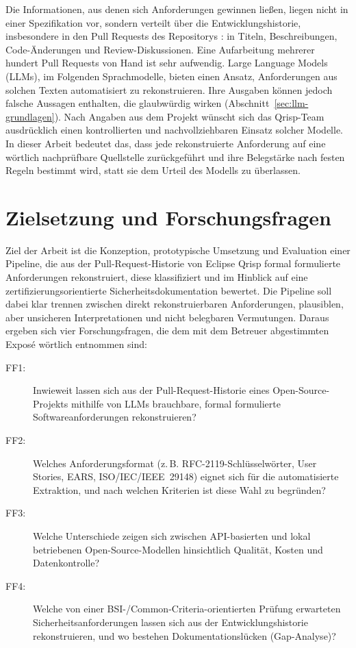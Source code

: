 \documentclass[11pt,a4paper]{report}
\begin{document}
Die Informationen, aus denen sich Anforderungen gewinnen ließen, liegen
nicht in einer Spezifikation vor, sondern verteilt über die
Entwicklungshistorie, insbesondere in den Pull Requests des Repositorys
: in Titeln, Beschreibungen, Code-Änderungen
und Review-Diskussionen. Eine Aufarbeitung mehrerer hundert Pull
Requests von Hand ist sehr aufwendig. Large Language Models (LLMs), im
Folgenden Sprachmodelle, bieten einen Ansatz, Anforderungen aus solchen
Texten automatisiert zu rekonstruieren. Ihre Ausgaben können jedoch
falsche Aussagen enthalten, die glaubwürdig wirken
(Abschnitt~\ref{sec:llm-grundlagen}). Nach Angaben aus dem Projekt
wünscht sich das Qrisp-Team ausdrücklich einen kontrollierten und
nachvollziehbaren Einsatz solcher Modelle. In dieser Arbeit bedeutet
das, dass jede rekonstruierte Anforderung auf eine wörtlich
nachprüfbare Quellstelle zurückgeführt und ihre Belegstärke nach festen
Regeln bestimmt wird, statt sie dem Urteil des Modells zu überlassen.

\section{Zielsetzung und Forschungsfragen}
\label{sec:einl-ziel}

Ziel der Arbeit ist die Konzeption, prototypische Umsetzung und
Evaluation einer Pipeline, die aus der Pull-Request-Historie von Eclipse
Qrisp formal formulierte Anforderungen rekonstruiert, diese klassifiziert
und im Hinblick auf eine zertifizierungsorientierte
Sicherheitsdokumentation bewertet. Die Pipeline soll dabei klar
trennen zwischen direkt rekonstruierbaren Anforderungen, plausiblen, aber
unsicheren Interpretationen und nicht belegbaren Vermutungen. Daraus
ergeben sich vier Forschungsfragen, die dem mit dem Betreuer
abgestimmten Exposé wörtlich entnommen sind:

\begin{description}
  \item[FF1:] Inwieweit lassen sich aus der Pull-Request-Historie eines
    Open-Source-Pro\-jekts mithilfe von LLMs brauchbare, formal
    formulierte Softwareanforderungen rekonstruieren?
  \item[FF2:] Welches Anforderungsformat (z.\,B.
    RFC-2119-Schlüsselwörter, User Stories, EARS, ISO/IEC/IEEE~29148)
    eignet sich für die automatisierte Extraktion, und nach welchen
    Kriterien ist diese Wahl zu begründen?
  \item[FF3:] Welche Unterschiede zeigen sich zwischen API-basierten und
    lokal betriebenen Open-Source-Modellen hinsichtlich Qualität, Kosten
    und Datenkontrolle?
  \item[FF4:] Welche von einer BSI-/\allowbreak Common-Criteria-orientierten Prüfung
    erwarteten Sicherheitsanforderungen lassen sich aus der
    Entwicklungshistorie rekonstruieren, und wo bestehen
    Dokumentationslücken (Gap-Analyse)?
\end{description}
\end{document}
